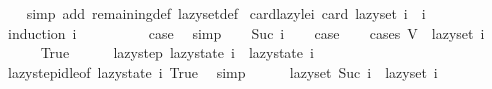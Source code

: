 \begin{isabellebody}
%
\isadelimproof
\ \ %
\endisadelimproof
%
\isatagproof
{}\isamarkupfalse%
\ {\isacharparenleft}{\kern0pt}simp\ add{\isacharcolon}{\kern0pt}\ remaining{\isacharunderscore}{\kern0pt}def\ lazy{\isacharunderscore}{\kern0pt}set{\isacharunderscore}{\kern0pt}def{\isacharparenright}{\kern0pt}%
\endisatagproof
{\isafoldproof}%
%
\isadelimproof
\isanewline
%
\endisadelimproof
\isanewline
{}\isamarkupfalse%
\ card{\isacharunderscore}{\kern0pt}lazy{\isacharunderscore}{\kern0pt}le{\isacharunderscore}{\kern0pt}i{\isacharcolon}{\kern0pt}\ {\isachardoublequoteopen}card\ {\isacharparenleft}{\kern0pt}lazy{\isacharunderscore}{\kern0pt}set\ i{\isacharparenright}{\kern0pt}\ {\isasymle}\ i{\isachardoublequoteclose}\isanewline
%
\isadelimproof
%
\endisadelimproof
%
\isatagproof
{}\isamarkupfalse%
\ {\isacharparenleft}{\kern0pt}induction\ i{\isacharparenright}{\kern0pt}\isanewline
\ \ \isamarkupfalse%
\ {}\isanewline
\ \ \isamarkupfalse%
\ \isamarkupfalse%
\ {\isacharquery}{\kern0pt}case\ \isamarkupfalse%
\ simp\isanewline
{}\isamarkupfalse%
\isanewline
\ \ \isamarkupfalse%
\ {\isacharparenleft}{\kern0pt}Suc\ i{\isacharparenright}{\kern0pt}\isanewline
\ \ \isamarkupfalse%
\ {\isacharquery}{\kern0pt}case\isanewline
\ \ \isamarkupfalse%
\ {\isacharparenleft}{\kern0pt}cases\ {\isachardoublequoteopen}V\ {\isacharminus}{\kern0pt}\ lazy{\isacharunderscore}{\kern0pt}set\ i\ {\isacharequal}{\kern0pt}\ {\isacharbraceleft}{\kern0pt}{\isacharbraceright}{\kern0pt}{\isachardoublequoteclose}{\isacharparenright}{\kern0pt}\isanewline
\ \ \ \ \isamarkupfalse%
\ True\isanewline
\ \ \ \ \isamarkupfalse%
\ {\isachardoublequoteopen}lazy{\isacharunderscore}{\kern0pt}step\ {\isacharparenleft}{\kern0pt}lazy{\isacharunderscore}{\kern0pt}state\ i{\isacharparenright}{\kern0pt}\ {\isacharequal}{\kern0pt}\ lazy{\isacharunderscore}{\kern0pt}state\ i{\isachardoublequoteclose}\isanewline
\ \ \ \ \ \ \isamarkupfalse%
\ lazy{\isacharunderscore}{\kern0pt}step{\isacharunderscore}{\kern0pt}idle{\isacharbrackleft}{\kern0pt}of\ {\isachardoublequoteopen}lazy{\isacharunderscore}{\kern0pt}state\ i{\isachardoublequoteclose}{\isacharbrackright}{\kern0pt}\ True\ \isamarkupfalse%
\ simp\isanewline
\ \ \ \ \isamarkupfalse%
\ {\isachardoublequoteopen}lazy{\isacharunderscore}{\kern0pt}set\ {\isacharparenleft}{\kern0pt}Suc\ i{\isacharparenright}{\kern0pt}\ {\isacharequal}{\kern0pt}\ lazy{\isacharunderscore}{\kern0pt}set\ i{\isachardoublequoteclose}\isanewline

\end{isabellebody}
